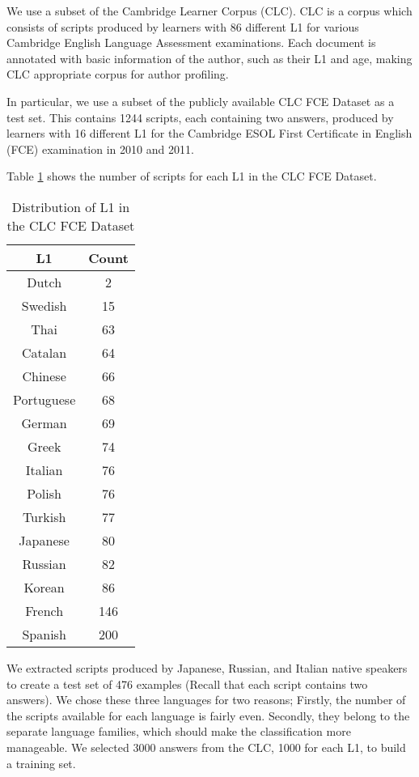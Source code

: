 We use a subset of the Cambridge Learner Corpus \citep{nicholls2003cambridge} (CLC).
CLC is a corpus which consists of scripts produced by learners with 86 different L1 for various Cambridge English Language Assessment examinations.
Each document is annotated with basic information of the author, such as their L1 and age, making CLC appropriate corpus for author profiling.

In particular, we use a subset of the publicly available CLC FCE Dataset \citep{yannakoudakis2011new} as a test set.
This contains 1244 scripts, each containing two answers, produced by learners with 16 different L1 for the Cambridge ESOL First Certificate in English (FCE) examination in 2010 and 2011.

Table \ref{tab:l1-fce} shows the number of scripts for each L1 in the CLC FCE Dataset.
\begin{table}[]
\centering
\caption{Distribution of L1 in the CLC FCE Dataset}
\label{tab:l1-fce}
\begin{tabular}{|c|c|}
\hline
L1         & Count \\ \hline
Dutch      & 2     \\ \hline
Swedish    & 15    \\ \hline
Thai       & 63    \\ \hline
Catalan    & 64    \\ \hline
Chinese    & 66    \\ \hline
Portuguese & 68    \\ \hline
German     & 69    \\ \hline
Greek      & 74    \\ \hline
Italian    & 76    \\ \hline
Polish     & 76    \\ \hline
Turkish    & 77    \\ \hline
Japanese   & 80    \\ \hline
Russian    & 82    \\ \hline
Korean     & 86    \\ \hline
French     & 146   \\ \hline
Spanish    & 200   \\ \hline
\end{tabular}
\end{table}
We extracted scripts produced by Japanese, Russian, and Italian native speakers to create a test set of 476 examples (Recall that each script contains two answers).
We chose these three languages for two reasons;
Firstly, the number of the scripts available for each language is fairly even.
Secondly, they belong to the separate language families, which should make the classification more manageable.
We selected 3000 answers from the CLC, 1000 for each L1, to build a training set.

